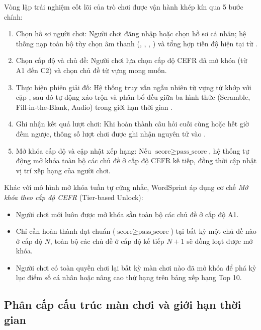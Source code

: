 Vòng lặp trải nghiệm cốt lõi của trò chơi được vận hành khép kín qua 5 bước chính:
\begin{enumerate}
    \item Chọn hồ sơ người chơi: Người chơi đăng nhập hoặc chọn hồ sơ cá nhân; hệ thống nạp toàn bộ tùy chọn âm thanh (, , , ) và tổng hợp tiến độ hiện tại từ .
    \item Chọn cấp độ và chủ đề: Người chơi lựa chọn cấp độ CEFR đã mở khóa (từ A1 đến C2) và chọn chủ đề từ vựng mong muốn.
    \item Thực hiện phiên giải đố: Hệ thống truy vấn ngẫu nhiên  từ vựng từ  khớp với cặp , sau đó tự động xáo trộn và phân bổ đều giữa ba hình thức (Scramble, Fill-in-the-Blank, Audio) trong giới hạn thời gian .
    \item Ghi nhận kết quả lượt chơi: Khi hoàn thành câu hỏi cuối cùng hoặc hết giờ đếm ngược, thông số lượt chơi được ghi nhận nguyên tử vào .
    \item Mở khóa cấp độ và cập nhật xếp hạng: Nếu $\text{score} \ge \text{pass\_score}$, hệ thống tự động mở khóa toàn bộ các chủ đề ở cấp độ CEFR kế tiếp, đồng thời cập nhật vị trí xếp hạng của người chơi.
\end{enumerate}

Khác với mô hình mở khóa tuần tự cứng nhắc, WordSprint áp dụng cơ chế \textit{Mở khóa theo cấp độ CEFR} (Tier-based Unlock):
\begin{itemize}
    \item Người chơi mới luôn được mở khóa sẵn toàn bộ các chủ đề ở cấp độ A1.
    \item Chỉ cần hoàn thành đạt chuẩn ($\text{score} \ge \text{pass\_score}$) tại bất kỳ một chủ đề nào ở cấp độ $N$, toàn bộ các chủ đề ở cấp độ kế tiếp $N+1$ sẽ đồng loạt được mở khóa.
    \item Người chơi có toàn quyền chơi lại bất kỳ màn chơi nào đã mở khóa để phá kỷ lục điểm số cá nhân hoặc nâng cao thứ hạng trên bảng xếp hạng Top 10.
\end{itemize}

\subsection{Phân cấp cấu trúc màn chơi và giới hạn thời gian}
\label{subsec:stage_structure_and_pacing}

